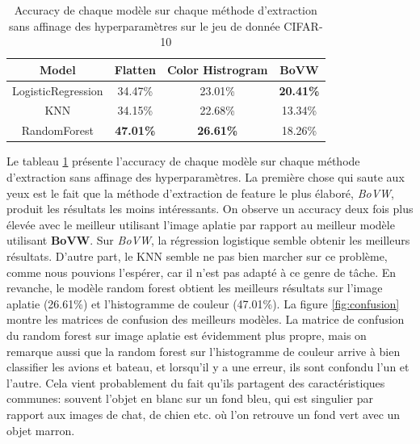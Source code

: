 \begin{table}[ht]
\centering
\begin{tabular}{|c|c|c|c|}
\toprule
Model & Flatten & Color Histrogram & BoVW \\
\midrule
LogisticRegression& 34.47\% & 23.01\%&\textbf{20.41\%} \\
KNN & 34.15\%& 22.68\%& 13.34\% \\
RandomForest & \textbf{47.01\%} & \textbf{26.61\%} & 18.26\% \\
\bottomrule
\end{tabular}
\caption{Accuracy de chaque modèle sur chaque méthode d'extraction sans affinage des hyperparamètres sur le jeu de donnée CIFAR-10}
\label{tab:result_no_ft}
\end{table}
Le tableau \ref{tab:result_no_ft} présente l'accuracy de chaque modèle sur chaque méthode d'extraction sans affinage des hyperparamètres. La première chose qui saute aux yeux est le fait que la méthode d'extraction de feature le plus élaboré, \textit{BoVW}, produit les résultats les moins intéressants. On observe un accuracy deux fois plus élevée avec le meilleur utilisant l'image aplatie par rapport au meilleur modèle utilisant \textbf{BoVW}. Sur \textit{BoVW}, la régression logistique semble obtenir les meilleurs résultats.
D'autre part, le KNN semble ne pas bien marcher sur ce problème, comme nous pouvions l'espérer, car il n'est pas adapté à ce genre de tâche.
En revanche, le modèle random forest obtient les meilleurs résultats sur l'image aplatie (26.61\%) et l'histogramme de couleur (47.01\%).
La figure \ref{fig:confusion} montre les matrices de confusion des meilleurs modèles. La matrice de confusion du random forest sur image aplatie est évidemment plus propre, mais on remarque aussi que la random forest sur l'histogramme de couleur arrive à bien classifier les avions et bateau, et lorsqu'il y a une erreur, ils sont confondu l'un et l'autre. Cela vient probablement du fait qu'ils partagent des caractéristiques communes: souvent l'objet en blanc sur un fond bleu, qui est singulier par rapport aux images de chat, de chien etc. où l'on retrouve un fond vert avec un objet marron.

